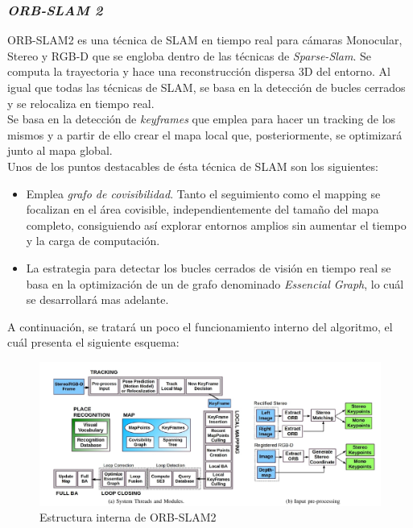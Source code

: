 \newpage
\subsubsection{\textit{ORB-SLAM 2}}
ORB-SLAM2 es una técnica de SLAM en tiempo real para cámaras Monocular, Stereo y RGB-D que se engloba dentro de las técnicas de 
\textit{Sparse-Slam}. Se computa la trayectoria y hace una reconstrucción dispersa 3D del entorno. Al igual que todas las técnicas 
de SLAM, se basa en la detección de bucles cerrados y  se relocaliza en tiempo real. \\
Se basa en la detección de \textit{keyframes} que emplea para hacer un tracking de los mismos y a partir de ello crear el 
mapa local que, posteriormente, se optimizará junto al mapa global. \\
Unos de los puntos destacables de ésta técnica de SLAM son los siguientes:
\begin{itemize}
    \item Emplea \textit{grafo de covisibilidad}. Tanto el seguimiento como el mapping se focalizan en el área covisible,
    independientemente del tamaño del mapa completo, consiguiendo así explorar entornos amplios sin
    aumentar el tiempo y la carga de computación.

    \item La estrategia para detectar los bucles cerrados de visión en tiempo real se basa en la optimización de
   un de grafo denominado \textit{Essencial Graph}, lo cuál se desarrollará mas adelante.
\end{itemize}

A continuación, se tratará un poco el funcionamiento interno del algoritmo, el cuál presenta el siguiente esquema:
\begin{figure}[h!]
    \centering
    \includegraphics[width=1\textwidth]{images/orb_scheme}
    \caption{Estructura interna de ORB-SLAM2}
\end{figure}

